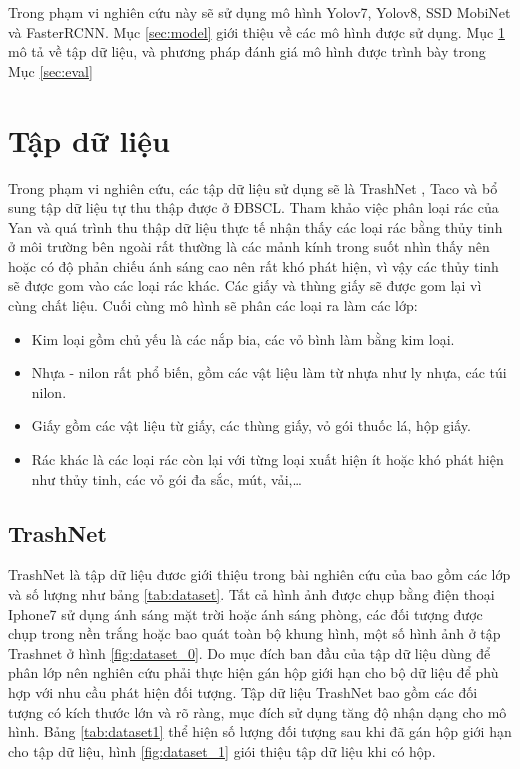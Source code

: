 \documentclass[../the.tex]{subfiles}
\begin{document}
Trong phạm vi nghiên cứu này sẽ sử dụng mô hình Yolov7, Yolov8, SSD MobiNet và FasterRCNN. Mục \ref{sec:model} giới thiệu về các mô hình được sử dụng. Mục \ref{sec:dataset} mô tả về tập dữ liệu, và phương pháp đánh giá mô hình được trình bày trong Mục \ref{sec:eval}

\section{Tập dữ liệu}
\label{sec:dataset}

{\fontsize{13}{12} \selectfont
	Trong phạm vi nghiên cứu, các tập dữ liệu sử dụng sẽ là TrashNet \cite{yang2016classification}, Taco \cite{proença2020taco} và bổ sung tập dữ liệu tự thu thập được ở ĐBSCL.
	Tham khảo việc phân loại rác của Yan \cite{yang2016classification} và quá trình thu thập dữ liệu thực tế nhận thấy các loại rác bằng thủy tinh ở môi trường bên ngoài rất thường là các mảnh kính trong suốt nhìn thấy nên hoặc có độ phản chiếu ánh sáng cao nên rất khó phát hiện, vì vậy các thủy tinh sẽ được gom vào các loại rác khác.
	Các giấy và thùng giấy sẽ được gom lại vì cùng chất liệu. Cuối cùng mô hình sẽ phân các loại ra làm các lớp:
	\begin{itemize}
		\item Kim loại gồm chủ yếu là các nắp bia, các vỏ bình làm bằng kim loại.
		\item Nhựa - nilon rất phổ biến, gồm các vật liệu làm từ nhựa như ly nhựa, các túi nilon.
		\item Giấy gồm các vật liệu từ giấy, các thùng giấy, vỏ gói thuốc lá, hộp giấy.
		\item Rác khác là các loại rác còn lại với từng loại xuất hiện ít hoặc khó phát hiện như thủy tinh, các vỏ gói đa sắc,
		      mút, vải,\dots
	\end{itemize}

\subsection{TrashNet}
\label{sec:trashnet}
	{\fontsize{13}{12} \selectfont
		TrashNet là tập dữ liệu đươc giới thiệu trong bài nghiên cứu của \cite{yang2016classification} bao gồm các lớp và số lượng như bảng \ref{tab:dataset}. Tất cả hình ảnh được chụp bằng điện thoại Iphone7 sử dụng ánh sáng mặt trời hoặc ánh sáng phòng, các đối tượng được chụp trong nền trắng hoặc bao quát toàn bộ khung hình, một số hình ảnh ở tập Trashnet ở hình
		\ref{fig:dataset_0}.
		Do mục đích ban đầu của tập dữ liệu dùng để phân lớp nên nghiên cứu phải thực hiện gán hộp giới hạn cho bộ dữ liệu để phù hợp với nhu cầu phát hiện đối tượng. Tập dữ liệu TrashNet bao gồm các đối tượng có kích thước lớn và rõ ràng, mục đích sử dụng tăng độ nhận dạng cho mô hình. Bảng \ref{tab:dataset1} thể hiện số lượng đối tượng sau khi đã gán hộp giới hạn cho tập dữ liệu, hình
		\ref{fig:dataset_1} giói thiệu tập dữ liệu khi có hộp.
	}
}
\end{document}
